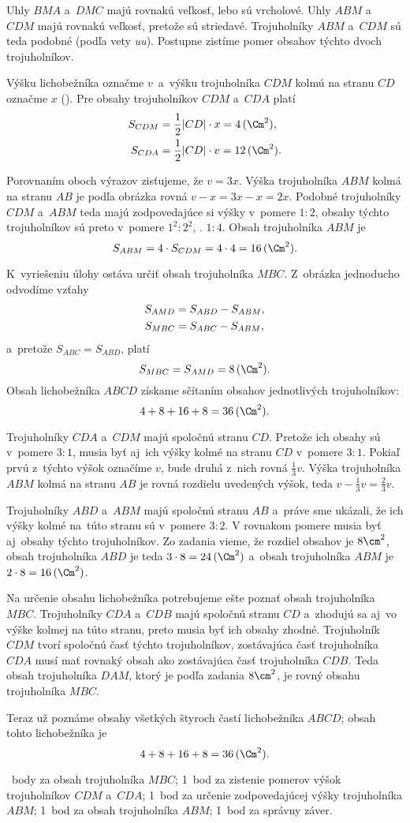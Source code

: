 {%
Uhly $BMA$ a~$DMC$ majú rovnakú veľkosť, lebo sú vrcholové.
Uhly $ABM$ a~$CDM$ majú rovnakú veľkosť, pretože sú striedavé.
Trojuholníky $ABM$ a~$CDM$ sú teda podobné (podľa vety {\it uu\/}).
Postupne zistíme pomer obsahov týchto dvoch trojuholníkov.
%

Výšku lichobežníka označme $v$~a~výšku trojuholníka $CDM$ kolmú na stranu
$CD$ označme $x$ (\obr). Pre obsahy trojuholníkov $CDM$ a~$CDA$ platí
$$
\aligned
S_{CDM} &=\frac12 |CD|\cdot x=4\,(\Cm^2),  \\   %
S_{CDA} &=\frac12 |CD|\cdot v=12\,(\Cm^2).   %
\endaligned
$$

Porovnaním oboch výrazov zisťujeme, že $v=3x$. Výška trojuholníka $ABM$
kolmá na stranu $AB$ je podľa obrázka rovná $v- x = 3x - x = 2x$.
Podobné trojuholníky $CDM$ a~$ABM$ teda majú zodpovedajúce si výšky v~pomere
$1:2$, obsahy týchto trojuholníkov sú preto v~pomere $1^2:2^2$, \tj.
$1:4$.
Obsah trojuholníka $ABM$ je
$$
S_{ABM} = 4\cdot S_{CDM} = 4\cdot 4 = 16\,(\Cm^2).
$$

K~vyriešeniu úlohy ostáva určiť obsah trojuholníka $MBC$.
Z~obrázka jednoducho odvodíme vzťahy
$$
\aligned
S_{AMD} &= S_{ABD}-S_{ABM}, \\
S_{MBC} &= S_{ABC} - S_{ABM},
\endaligned
$$
a~pretože $S_{ABC} = S_{ABD}$, platí
$$
S_{MBC} = S_{AMD}=8\,(\Cm^2).
$$
Obsah lichobežníka $ABCD$ získame sčítaním obsahov jednotlivých trojuholníkov:
$$
4 + 8 + 16 + 8 = 36\,(\Cm^2).
$$

\ineriesenie
Trojuholníky $CDA$ a~$CDM$ majú spoločnú stranu $CD$.
Pretože ich obsahy sú v~pomere $3:1$, musia byť aj~ich výšky kolmé na stranu $CD$ v~pomere $3:1$.
Pokiaľ prvú z~týchto výšok označíme $v$, bude druhá z~nich rovná $\frac13v$.
Výška trojuholníka $ABM$ kolmá na stranu $AB$ je rovná rozdielu uvedených
výšok, teda $v-\frac13v =\frac23v$.

Trojuholníky $ABD$ a~$ABM$ majú spoločnú stranu $AB$ a~práve sme ukázali,
že ich výšky kolmé na~túto stranu sú v~pomere $3:2$. V rovnakom pomere
musia byť aj~obsahy týchto trojuholníkov. Zo zadania vieme, že rozdiel obsahov je
$8\cm^2$, obsah trojuholníka $ABD$ je teda $3\cdot8= 24\,(\Cm^2)$ a~obsah
trojuholníka $ABM$ je $2\cdot8= 16\,(\Cm^2)$.

Na určenie obsahu lichobežníka potrebujeme ešte poznať obsah trojuholníka $MBC$.
Trojuholníky $CDA$ a~$CDB$ majú spoločnú stranu $CD$ a~zhodujú sa aj~vo
výške kolmej na túto stranu, preto musia byť ich obsahy zhodné.
Trojuholník $CDM$ tvorí spoločnú časť týchto trojuholníkov, zostávajúca časť
trojuholníka $CDA$ musí mať rovnaký obsah ako zostávajúca časť trojuholníka
$CDB$. Teda obsah trojuholníka $DAM$, ktorý je podľa zadania $8\cm^2$, je rovný
obsahu trojuholníka $MBC$.


Teraz už poznáme obsahy všetkých štyroch častí lichobežníka $ABCD$;
obsah tohto lichobežníka je
$$
4 + 8 + 16 + 8 = 36\,(\Cm^2).
$$

~body za obsah trojuholníka $MBC$;
1~bod za zistenie pomerov výšok trojuholníkov $CDM$ a~$CDA$;
1~bod za určenie zodpovedajúcej výšky trojuholníka $ABM$;
1~bod za obsah trojuholníka $ABM$;
1~bod za správny záver.
\endhodnotenie
}

